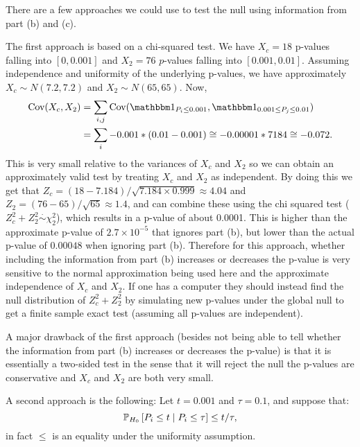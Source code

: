 \begin{enumerate}
There are a few approaches we could use to test the null using information from part (b) and (c).


The first approach is based on a chi-squared test. We have $X_c = 18$ p-values falling into $[0, 0.001]$ and $X_2 = 76$ $p$-values falling into $[0.001, 0.01]$. Assuming independence and uniformity of the underlying p-values, we have approximately $X_c \sim N(7.2, 7.2)$ and $X_2 \sim N(65, 65)$. Now,
\begin{align*}
\text{Cov}(X_c,X_2) & = \sum_{i,j} \text{Cov}(\bone_{P_i \leq 0.001},\bone_{0.001 \leq P_j \leq 0.01})\\
& = \sum_{i} - 0.001*(0.01-0.001) \cong -0.00001*7184 \cong -0.072.
\end{align*}
This is very small relative to the variances of $X_c$ and $X_2$ so we can obtain an approximately valid test by treating $X_c$ and $X_2$ as independent. By doing this we get that $Z_c = (18 - 7.184)/\sqrt{7.184 \times 0.999} \approx 4.04 $ and $Z_2 = (76 - 65)/\sqrt{65} \approx 1.4$, and can combine these using the chi squared test ($Z_c^2 + Z_2^2 \overset{\cdot}{\sim} \chi_2^2$), which results in a p-value of about 0.0001. This is higher than the approximate p-value of $2.7 \times 10^{-5}$ that ignores part (b), but lower than the actual p-value of  $0.00048$ when ignoring part (b). Therefore for this approach, whether including the information from part (b) increases or decreases the p-value is very sensitive to the normal approximation being used here and the approximate independence of $X_c$ and $X_2$. If one has a computer they should instead find the null distribution of $Z_c^2 + Z_2^2$ by simulating new p-values under the global null to get a finite sample exact test (assuming all p-values are independent).

A major drawback of the first approach (besides not being able to tell whether the information from part (b) increases or decreases the p-value) is that it is essentially a two-sided test in the sense that it will reject the null the p-values are conservative and $X_c$ and $X_2$ are both very small.


A second approach is the following: Let $t = 0.001$ and $\tau = 0.1$, and suppose that: 
\begin{equation}
\label{eq:uniformly_conservative}
\PP[H_0]{P_i \leq t \mid P_i \leq \tau} \leq t/\tau,
\end{equation}
in fact $\leq$ is an equality under the uniformity assumption. 



\end{enumerate}
